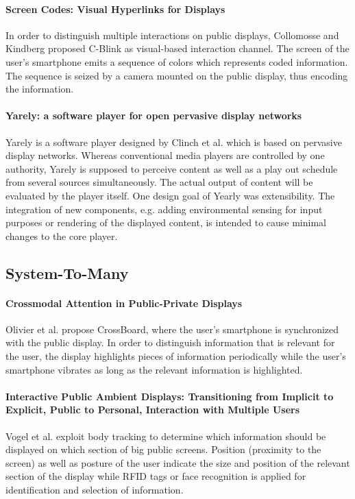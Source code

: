 \paragraph{Screen Codes: Visual Hyperlinks for Displays}
In order to distinguish multiple interactions on public displays, Collomosse and Kindberg \cite{Collomosse_ScreenCodes} proposed C-Blink as visual-based interaction channel. The screen of the user’s smartphone emits a sequence of colors which represents coded information. The sequence is seized by a camera mounted on the public display, thus encoding the information.

\paragraph{Yarely: a software player for open pervasive display networks}
Yarely is a software player designed by Clinch et al. \cite{Clinch_Yarely} which is based on pervasive display networks. Whereas conventional media players are controlled by one authority, Yarely is supposed to perceive content as well as a play out schedule from several sources simultaneously. The actual output of content will be evaluated by the player itself.
One design goal of Yearly was extensibility. The integration of new components, e.g. adding environmental sensing for input purposes or rendering of the displayed content, is intended to cause minimal changes to the core player.


\subsection{System-To-Many}

\paragraph{Crossmodal Attention in Public-Private Displays}
Olivier et al. \cite{Olivier_Crossmodal} propose CrossBoard, where the user’s smartphone is synchronized with the public display.
In order to distinguish information that is relevant for the user, the display highlights pieces of information periodically while the user’s smartphone vibrates as long as the relevant information is highlighted.

\paragraph{Interactive Public Ambient Displays: Transitioning from Implicit to Explicit, Public to Personal, Interaction with Multiple Users}
Vogel et al.\cite{Vogel_InteractivePublicAmbient} exploit body tracking to determine which information should be displayed on which section of big public screens. Position (proximity to the screen) as well as posture of the user indicate the size and position of the relevant section of the display while RFID tags or face recognition is applied for identification and selection of information.

